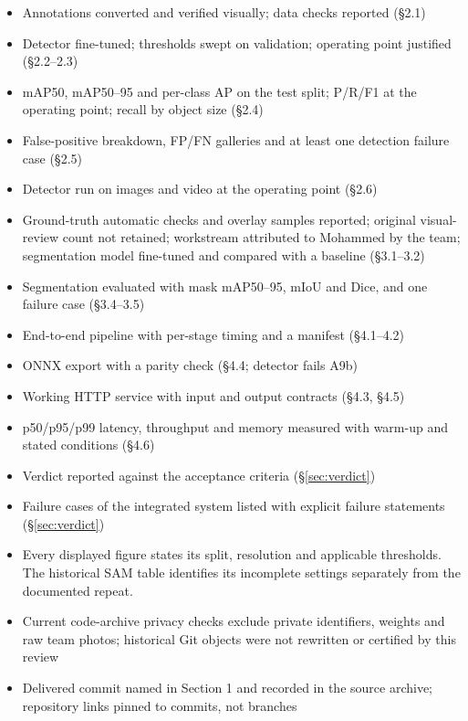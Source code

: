 \documentclass[11pt,a4paper]{article}
\begin{document}
\begin{itemize}[leftmargin=1.6em,itemsep=2pt]
  \item[$\checkmark$] Annotations converted and verified visually; data checks reported (\S2.1)
  \item[$\checkmark$] Detector fine-tuned; thresholds swept on validation; operating point justified (\S2.2--2.3)
  \item[$\checkmark$] mAP50, mAP50--95 and per-class AP on the test split; P/R/F1 at the operating point; recall by object size (\S2.4)
  \item[$\checkmark$] False-positive breakdown, FP/FN galleries and at least one detection failure case (\S2.5)
  \item[$\checkmark$] Detector run on images and video at the operating point (\S2.6)
  \item[$\checkmark$] Ground-truth automatic checks and overlay samples reported; original visual-review count not retained; workstream attributed to Mohammed by the team; segmentation model fine-tuned and compared with a baseline (\S3.1--3.2)
  \item[$\checkmark$] Segmentation evaluated with mask mAP50--95, mIoU and Dice, and one failure case (\S3.4--3.5)
  \item[$\checkmark$] End-to-end pipeline with per-stage timing and a manifest (\S4.1--4.2)
  \item[$\checkmark$] ONNX export with a parity check (\S4.4; detector fails A9b)
  \item[$\checkmark$] Working HTTP service with input and output contracts (\S4.3, \S4.5)
  \item[$\checkmark$] p50/p95/p99 latency, throughput and memory measured with warm-up and stated conditions (\S4.6)
  \item[$\checkmark$] Verdict reported against the acceptance criteria (\S\ref{sec:verdict})
  \item[$\checkmark$] Failure cases of the integrated system listed with explicit failure statements (\S\ref{sec:verdict})
  \item Every displayed figure states its split, resolution and applicable thresholds. The historical SAM table identifies its incomplete settings separately from the documented repeat.
  \item[$\checkmark$] Current code-archive privacy checks exclude private identifiers, weights and raw team photos; historical Git objects were not rewritten or certified by this review
  \item[$\checkmark$] Delivered commit named in Section 1 and recorded in the source archive; repository links pinned to commits, not branches

\end{itemize}
\end{document}
